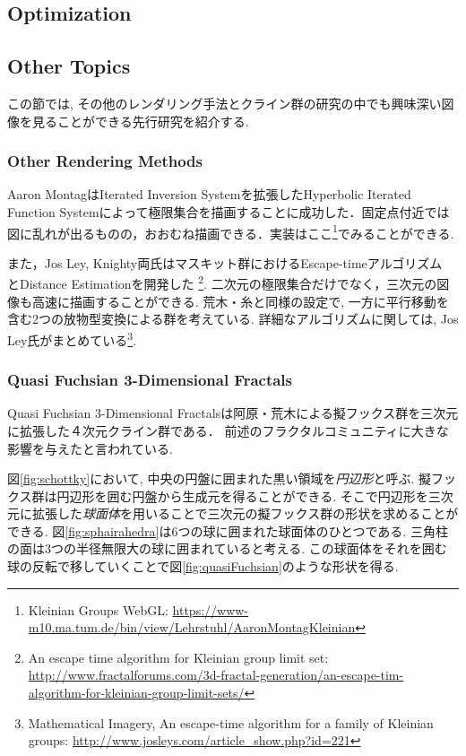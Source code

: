 \subsection{Optimization}


\subsection{Other Topics}

この節では, その他のレンダリング手法とクライン群の研究の中でも興味深い図像を見ることができる先行研究を紹介する.

\subsubsection{Other Rendering Methods}
Aaron MontagはIterated Inversion Systemを拡張したHyperbolic Iterated Function Systemによって極限集合を描画することに成功した\cite{hyperbolicIFS}．固定点付近では図に乱れが出るものの，おおむね描画できる．実装はここ\footnote{Kleinian Groups WebGL: \url{https://www-m10.ma.tum.de/bin/view/Lehrstuhl/AaronMontagKleinian}}でみることができる.

また，Jos Ley, Knighty両氏はマスキット群におけるEscape-timeアルゴリズム
とDistance Estimationを開発した
\footnote{An escape time algorithm for Kleinian group limit set:\\ \quad
\quad \url{http://www.fractalforums.com/3d-fractal-generation/an-escape-tim-algorithm-for-kleinian-group-limit-sets/}}.
 二次元の極限集合だけでなく，三次元の図像も高速に描画することができる.
荒木・糸\cite{maskit}と同様の設定で, 一方に平行移動を含む2つの放物型変換による群を考えている.
詳細なアルゴリズムに関しては, Jos Ley氏がまとめている\footnote{Mathematical Imagery, An escape-time algorithm for a family of Kleinian groups: \url{http://www.josleys.com/article_show.php?id=221}}.

\subsubsection{Quasi Fuchsian 3-Dimensional Fractals}

Quasi Fuchsian 3-Dimensional Fractalsは阿原・荒木による擬フックス群を三次元に拡張した４次元クライン群である\cite{sphairahedra}\cite{sphairahedraJa}．
前述のフラクタルコミュニティに大きな影響を与えたと言われている.

図\ref{fig:schottky}において, 中央の円盤に囲まれた黒い領域を\emph{円辺形}と呼ぶ.
擬フックス群は円辺形を囲む円盤から生成元を得ることができる.
そこで円辺形を三次元に拡張した\emph{球面体}を用いることで三次元の擬フックス群の形状を求めることができる.
図\ref{fig:sphairahedra}は6つの球に囲まれた球面体のひとつである.
三角柱の面は3つの半径無限大の球に囲まれていると考える.
この球面体をそれを囲む球の反転で移していくことで図\ref{fig:quasiFuchsian}のような形状を得る.

